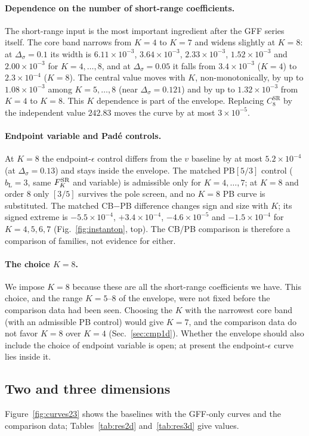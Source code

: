 \documentclass[11pt,a4paper]{article}
\numberwithin{equation}{section}
\newcommand{\Ds}{\Delta_\sigma}
\newcommand{\bL}{b_{\mathrm L}}
\newcommand{\CSR}{C^{\mathrm{SR}}}
\newcommand{\sci}[2]{#1\times10^{#2}}
\begin{document}
\paragraph{Dependence on the number of short-range coefficients.} The short-range input is
the most important ingredient after the GFF series itself. The core band narrows from
$K=4$ to $K=7$ and widens slightly at $K=8$: at $\Ds=0.1$ its width is $\sci{6.11}{-3}$,
$\sci{3.64}{-3}$, $\sci{2.33}{-3}$, $\sci{1.52}{-3}$ and $\sci{2.00}{-3}$ for $K=4,\dots,8$,
and at $\Ds=0.05$ it falls from $\sci{3.4}{-3}$ ($K=4$) to $\sci{2.3}{-4}$ ($K=8$). The central value moves with $K$,
non-monotonically, by up to $\sci{1.08}{-3}$ among $K=5,\dots,8$ (near $\Ds=0.121$) and by up
to $\sci{1.32}{-3}$ from $K=4$ to $K=8$. This $K$ dependence is part of the envelope.
Replacing $\CSR_8$ by the independent value $242.83$ moves the curve by at most
$\sci{3}{-5}$.

\paragraph{Endpoint variable and Pad\'e controls.} At $K=8$ the endpoint-$\epsilon$ control
differs from the $v$ baseline by at most $\sci{5.2}{-4}$ (at $\Ds=0.13$) and stays inside the
envelope. The matched PB$[5/3]$ control ($\bL=3$, same $F^{\rm SR}_K$ and variable) is
admissible only for $K=4,\dots,7$; at $K=8$ and order 8 only $[3/5]$ survives the pole screen, and no
$K=8$ PB curve is substituted. The matched CB$-$PB difference changes sign and size with
$K$; its signed extreme is $\sci{-5.5}{-4}$, $\sci{+3.4}{-4}$, $\sci{-4.6}{-5}$ and
$\sci{-1.5}{-4}$ for $K=4,5,6,7$ (Fig.~\ref{fig:instanton}, top). The CB/PB comparison is
therefore a comparison of families, not evidence for either.

\paragraph{The choice $K=8$.} We impose $K=8$ because these are all the short-range
coefficients we have. This choice, and the range $K=5$--$8$ of the envelope, were not fixed
before the comparison data had been seen. Choosing the $K$ with the narrowest core band (with
an admissible PB control) would give $K=7$, and the comparison data do not favor $K=8$ over
$K=4$ (Sec.~\ref{sec:cmp1d}). Whether the envelope should also include the choice of endpoint
variable is open; at present the endpoint-$\epsilon$ curve lies inside it.

\subsection{Two and three dimensions}\label{sec:res23}
Figure~\ref{fig:curves23} shows the baselines with the GFF-only curves and the comparison
data; Tables~\ref{tab:res2d} and~\ref{tab:res3d} give values.
\end{document}
